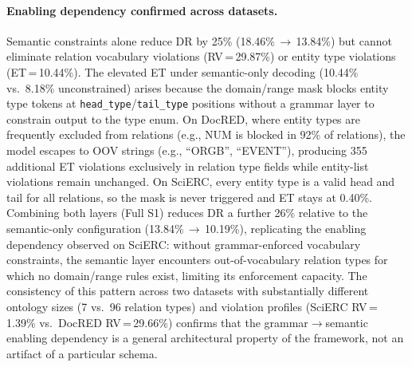 \paragraph{Enabling dependency confirmed across datasets.}
Semantic constraints alone reduce DR by 25\%
(18.46\%\,$\to$\,13.84\%) but cannot eliminate relation vocabulary
violations (RV\,=\,29.87\%) or entity type violations
(ET\,=\,10.44\%).
The elevated ET under semantic-only decoding (10.44\% vs.\ 8.18\%
unconstrained) arises because the domain/range mask blocks entity type
tokens at \texttt{head\_type}/\texttt{tail\_type} positions without a
grammar layer to constrain output to the type enum.
On DocRED, where entity types are frequently excluded from relations
(e.g., \textsc{NUM} is blocked in 92\% of relations), the model
escapes to OOV strings (e.g., ``ORGB'', ``EVENT''), producing 355
additional ET violations exclusively in relation type fields while
entity-list violations remain unchanged.
On SciERC, every entity type is a valid head and tail for all
relations, so the mask is never triggered and ET stays at 0.40\%.
Combining both layers (Full S1) reduces DR a further 26\% relative to
the semantic-only configuration (13.84\%\,$\to$\,10.19\%),
replicating the enabling dependency observed on SciERC:
without grammar-enforced vocabulary constraints, the semantic layer
encounters out-of-vocabulary relation types for which no domain/range
rules exist, limiting its enforcement capacity.
The consistency of this pattern across two datasets with substantially
different ontology sizes (7 vs.\ 96 relation types) and violation
profiles (SciERC RV\,=\,1.39\% vs.\ DocRED RV\,=\,29.66\%) confirms
that the grammar$\to$semantic enabling dependency is a general
architectural property of the framework, not an artifact of a
particular schema.

